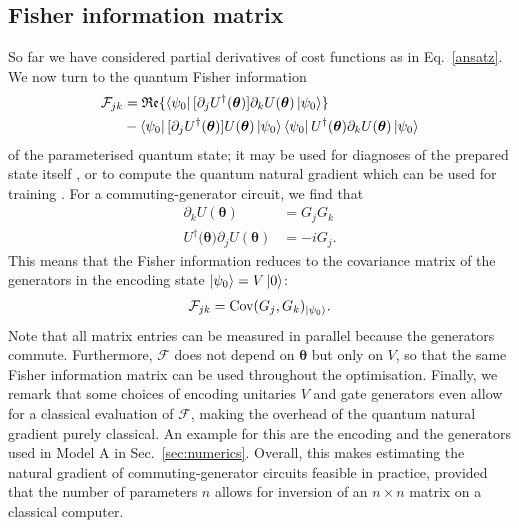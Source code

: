 \documentclass[a4paper,twocolumn,11pt]{quantumarticle}
\renewcommand{\vec}{\boldsymbol}
\begin{document}
\subsection{Fisher information matrix}
So far we have considered partial derivatives of cost functions as in Eq.~\eqref{ansatz}.
We now turn to the quantum Fisher information 
%
\begin{align}
    \mathcal{F}_{jk} &= \mathfrak{Re}\{
    \bra{\psi_0}[\partial_j U^\dagger(\vec\theta)] \partial_k U(\vec\theta) \ket{\psi_0}
    \} \\
    &- \bra{\psi_0}[\partial_jU^\dagger(\vec{\theta})] U(\vec{\theta})\ket{\psi_0}
    \bra{\psi_0}U^\dagger(\vec{\theta}) \partial_k U(\vec{\theta})\ket{\psi_0}\nonumber
\end{align}
%
of the parameterised quantum state;
it may be used for diagnoses of the prepared state itself \cite{Meyer2021fisherinformation,Toth_2014,fisher_info_universality}, or to compute the quantum natural gradient which can be used for training \cite{Stokes2020quantumnatural}.
For a commuting-generator circuit, we find that
%
\begin{align}
    [\partial_j U^\dagger(\vec{\theta)}]\partial_k U(\vec\theta) &= G_jG_k\\
    U^\dagger(\vec{\theta)} \partial_j U(\vec\theta) &= -i G_j.
\end{align}
%
This means that the Fisher information reduces to the covariance matrix of the generators in the encoding state $\ket{\psi_0}=V\ket{0}$:
%
\begin{align}
    \mathcal{F}_{jk} = \text{Cov}(G_j, G_k)_{\ket{\psi_0}}.
\end{align}
%
Note that all matrix entries can be measured in parallel because the generators commute. Furthermore, $\mathcal{F}$ does not depend on $\vec{\theta}$ but only on $V$, so that the same Fisher information matrix can be used throughout the optimisation.
Finally, we remark that some choices of encoding unitaries $V$ and gate generators even allow for a classical evaluation of $\mathcal{F}$, making the overhead of the quantum natural gradient purely classical. An example for this are the encoding and the generators used in Model A in Sec.\ \ref{sec:numerics}.
Overall, this makes estimating the natural gradient of commuting-generator circuits feasible in practice, provided that the number of parameters $n$ allows for inversion of an $n \times n$ matrix on a classical computer.
\end{document}
